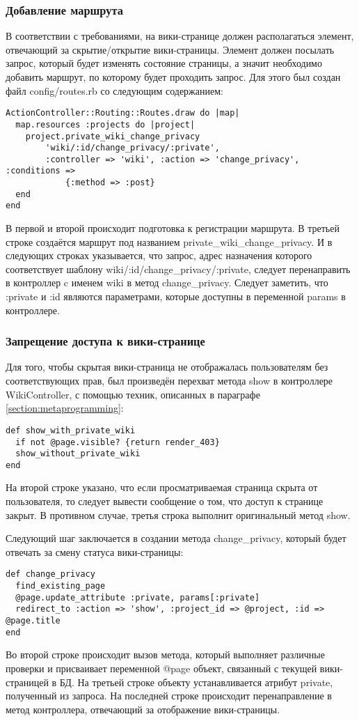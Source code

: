 \subsubsection{Добавление маршрута}
В соответствии с требованиями, на вики-странице должен располагаться элемент,
отвечающий за скрытие/открытие вики-страницы. Элемент должен посылать запрос,
который будет изменять состояние страницы, а значит необходимо добавить
маршрут, по которому будет проходить запрос. Для этого был создан файл
config/routes.rb со следующим содержанием:
\small{\begin{lstlisting}
ActionController::Routing::Routes.draw do |map|
  map.resources :projects do |project|
    project.private_wiki_change_privacy
        'wiki/:id/change_privacy/:private',
        :controller => 'wiki', :action => 'change_privacy',  :conditions =>
            {:method => :post}
  end
end
\end{lstlisting}}
В первой и второй происходит подготовка к регистрации маршрута. В третьей
строке создаётся маршрут под названием private\_wiki\_change\_privacy. И в
следующих строках указывается, что запрос, адрес назначения которого
соответствует шаблону wiki/:id/change\_privacy/:private, следует перенаправить
в контроллер c именем wiki в метод change\_privacy. Следует заметить, что
:private и :id являются параметрами, которые доступны в переменной params в
контроллере.

\subsubsection{Запрещение доступа к вики-странице}
Для того, чтобы скрытая вики-страница не отображалась пользователям без
соответствующих прав, был произведён перехват метода show в контроллере
WikiController, с помощью техник, описанных в параграфе
\ref{section:metaprogramming}:
\small{\begin{lstlisting}
def show_with_private_wiki
  if not @page.visible? {return render_403}
  show_without_private_wiki
end
\end{lstlisting}}
На второй строке указано, что если просматриваемая страница скрыта
от пользователя, то следует вывести сообщение о том, что доступ к
странице закрыт. В противном случае, третья строка выполнит оригинальный
метод show.

Следующий шаг заключается в создании метода change\_privacy, который будет
отвечать за смену статуса вики-страницы:
\small{\begin{lstlisting}
def change_privacy
  find_existing_page
  @page.update_attribute :private, params[:private]
  redirect_to :action => 'show', :project_id => @project, :id => @page.title
end
\end{lstlisting}}
Во второй строке происходит вызов метода, который выполняет различные проверки
и присваивает переменной @page объект, связанный с текущей вики-страницей в БД.
На третьей строке объекту устанавливается атрибут private, полученный из
запроса. На последней строке происходит перенаправление в метод контроллера,
отвечающий за отображение вики-страницы.


